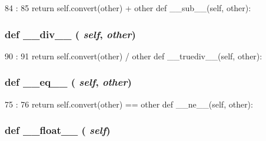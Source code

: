 \begin{DoxyCode}
84                             :
85         return self.convert(other) + other
    def __sub__(self, other):
\end{DoxyCode}
\hypertarget{classm5_1_1util_1_1smartdict_1_1Variable_ac3c5c39796d9cc1889749840f456b3e5}{
\subsubsection[{\_\-\_\-div\_\-\_\-}]{\setlength{\rightskip}{0pt plus 5cm}def \_\-\_\-div\_\-\_\- ( {\em self}, \/   {\em other})}}
\label{classm5_1_1util_1_1smartdict_1_1Variable_ac3c5c39796d9cc1889749840f456b3e5}



\begin{DoxyCode}
90                             :
91         return self.convert(other) / other
    def __truediv__(self, other):
\end{DoxyCode}
\hypertarget{classm5_1_1util_1_1smartdict_1_1Variable_a449f8fd74d358c0ad641b6c6d6917ba0}{
\subsubsection[{\_\-\_\-eq\_\-\_\-}]{\setlength{\rightskip}{0pt plus 5cm}def \_\-\_\-eq\_\-\_\- ( {\em self}, \/   {\em other})}}
\label{classm5_1_1util_1_1smartdict_1_1Variable_a449f8fd74d358c0ad641b6c6d6917ba0}



\begin{DoxyCode}
75                            :
76         return self.convert(other) == other
    def __ne__(self, other):
\end{DoxyCode}
\hypertarget{classm5_1_1util_1_1smartdict_1_1Variable_aa9419090a59d0dc1a40065e76ab0baf9}{
\subsubsection[{\_\-\_\-float\_\-\_\-}]{\setlength{\rightskip}{0pt plus 5cm}def \_\-\_\-float\_\-\_\- ( {\em self})}}
\label{classm5_1_1util_1_1smartdict_1_1Variable_aa9419090a59d0dc1a40065e76ab0baf9}



